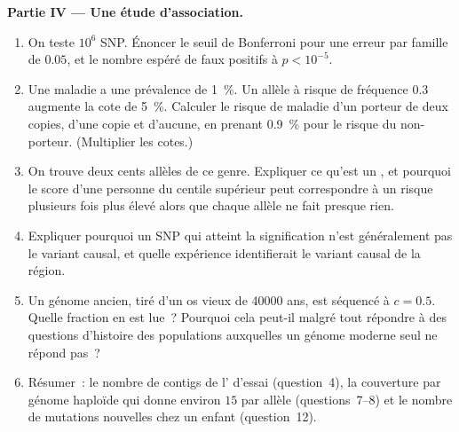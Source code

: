 \begin{problem}
\medskip
\noindent\textbf{Partie IV --- Une étude d'association.}
\begin{enumerate}[resume]
  \item On teste $10^{6}$ SNP. Énoncer le seuil de Bonferroni pour une
        erreur par famille de $0.05$, et le nombre espéré de faux
        positifs à $p < 10^{-5}$.
  \item Une maladie a une prévalence de \qty{1}{\%}. Un allèle à risque
        de fréquence $0.3$ augmente la cote de \qty{5}{\%}. Calculer le
        risque de maladie d'un porteur de deux copies, d'une copie et
        d'aucune, en prenant \qty{0.9}{\%} pour le risque du
        non-porteur. (Multiplier les cotes.)
  \item On trouve deux cents allèles de ce genre. Expliquer ce qu'est
        un , et pourquoi le score d'une personne du
        centile supérieur peut correspondre à un risque plusieurs fois
        plus élevé alors que chaque allèle ne fait presque rien.
  \item Expliquer pourquoi un SNP qui atteint la signification n'est
        généralement pas le variant causal, et quelle expérience
        identifierait le variant causal de la région.
  \item Un génome ancien, tiré d'un os vieux de \num{40000} ans, est
        séquencé à $c = 0.5$. Quelle fraction en est lue~? Pourquoi
        cela peut-il malgré tout répondre à des questions d'histoire
        des populations auxquelles un génome moderne seul ne répond
        pas~?
  \item Résumer~: le nombre de contigs de l' d'essai
        (question~4), la couverture par génome haploïde qui donne
        environ $15$  par allèle (questions~7--8) et le nombre
        de mutations nouvelles chez un enfant (question~12).
\end{enumerate}
\end{problem}
